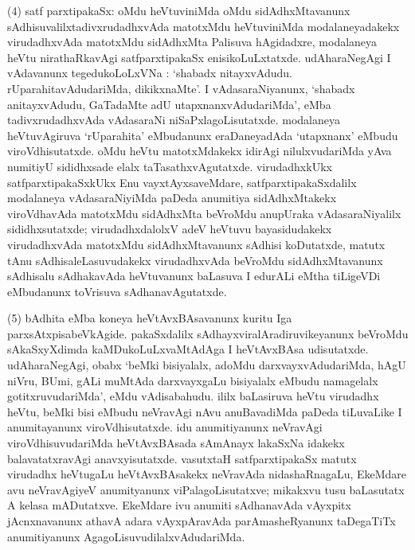 (4) satf parxtipakaSx: oMdu heVtuviniMda oMdu sidAdhxMtavanunx sAdhisuvalilx\break tadivx\-rudadhxvAda matotxMdu heVtuviniMda modalaneyadakekx virudadhxvAda matotxMdu sidAdhxMta Palisuva hAgidadxre, modalaneya heVtu nirathaRkavAgi satfparxtipakaSx enisi\-koLuLxtatxde. udAharaNegAgi I vAdavanunx tegedukoLoLxVNa : `shabadx nitayxvAdudu. rUparahitavAdudariMda, dikikxnaMte'. I vAdasaraNiyanunx, `shabadx anitayxvAdudu, GaTadaMte adU utapxnanxvAdudariMda', eMba tadivxrudadhxvAda vAdasaraNi niSaPxlagoLisutatxde. modalaneya heVtuvAgiruva `rUparahita' eMbudanunx eraDaneyadAda \hbox{`utapxnanx'} eMbudu viroVdhisutatxde. oMdu heVtu matotxMdakekx idirAgi nilulxvudariMda yAva numitiyU sididhxsade elalx taTasathxvAgutatxde. virudadhxkUkx satfparxtipakaSxkUkx Enu vayxtAyxsa\-veMdare, satfparxtipakaSxdalilx modalaneya vAdasaraNiyiMda paDeda anumitiya sidAdhxM\-takekx viroVdhavAda matotxMdu sidAdhxMta beVroMdu anupUraka vAdasaraNiyalilx sididhx\-sutatxde; virudadhxdalolxV adeV heVtuvu bayasidudakekx virudadhxvAda matotxMdu sidAdhxMta\-vanunx sAdhisi koDutatxde, matutx tAnu sAdhisaleLasuvudakekx virudadhxvAda beVroMdu sidAdhxMtavanunx sAdhisalu sAdhakavAda heVtuvanunx baLasuva I edurALi eMtha tiLigeVDi eMbudanunx toVrisuva sAdhanavAgutatxde.

(5) bAdhita eMba koneya heVtAvxBAsavanunx kuritu Iga parxsAtxpisabeVkAgide. pakaSxdalilx sAdhayxviralAradiruvikeyanunx beVroMdu sAkaSxyXdimda kaMDukoLuLxvaMtAdAga I heVtAvxBAsa udisutatxde. udAharaNegAgi, obabx `beMki bisiyalalx, adoMdu darxvayx\-vAdudariMda, hAgU niVru, BUmi, gALi muMtAda darxvayxgaLu bisiyalalx eMbudu namagelalx gotitxruvudariMda', eMdu vAdisabahudu. ililx baLasiruva heVtu \hbox{virudadhx} heVtu, beMki bisi eMbudu neVravAgi nAvu anuBavadiMda paDeda tiLuvaLike I anu\-mitayanunx viroVdhisutatxde. idu anumitiyanunx neVravAgi viroVdhisuvu\-dariMda heVtAvxBAsada sAmAnayx lakaSxNa idakekx balavatatxravAgi anavxyisutatxde. vasutxtaH satf\-parxtipakaSx matutx virudadhx heVtugaLu heVtAvxBAsakekx neVravAda nidashaRnagaLu, EkeMdare avu neVra\-vAgiyeV anumityanunx viPalagoLisutatxve; mikakxvu tusu baLasutatx A kelasa mADu\-tatxve. EkeMdare ivu anumiti sAdhanavAda vAyxpitx jAcnxnavanunx athavA adara vAyxpAra\-vAda parAmasheRyanunx taDegaTiTx anumitiyanunx AgagoLisuvudilalxvAdudariMda.

